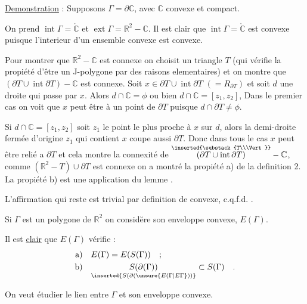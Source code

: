 \uline{Demonstration} : Supposons $\Gamma=\partial\mathbb{C}$, avec $\mathbb{C}$ convexe et compact.

On prend $\operatorname{int}\Gamma=\mathring{\mathbb{C}}$ et $\operatorname{ext}\Gamma=\mathbb{R}^{2}-\mathbb{C}$. Il est clair que $\operatorname{int}\Gamma=\mathring{\mathbb{C}}$ est convexe puisque l'interieur d'un ensemble convexe est convexe.

Pour montrer que $\mathbb{R}^{2}-\mathbb{C}$ est connexe on choisit un triangle $T$ (qui vérifie la propiété d'être un J-polygone par des raisons elementaires) et on montre que $(\partial T\cup\operatorname{int}\partial T)-\mathbb{C}$ est connexe. Soit $x\in\partial T\cup\operatorname{int}\partial T$  $(=R_{\partial T})$  et soit $d$ une droite qui passe par $x$. Alors $d\cap\mathbb{C}=\phi$ ou bien $d\cap\mathbb{C}=[z_1,z_2]$, Dans le premier cas on voit que $x$ peut être  à un point de $\partial T$ puisque $d\cap\partial T\ne\phi$.

Si $d\cap\mathbb{C}=[z_1,z_2]$ soit $z_1$ le point  le plus proche à $x$ sur $d$, alors la demi-droite fermée d'origine $z_1$ qui contient $x$ coupe aussi $\partial T$. Donc dans tous le cas $x$ peut être relié a $\partial T$ et cela montre la connexité de $\overset{\inserted{\substack{T\\\Vert}}}{(\partial T\cup\operatorname{int}\partial T)}-\mathbb{C}$, comme $(\mathbb{R}^{2}-T)\cup\partial T$ est connexe  on a montré la propiété a) de la definition 2. La propiété b) est une application  du lemme .

\margin{$\bullet$}
L'affirmation qui reste est trivial par definition de convexe,  c.q.f.d. .

\margin{$\bullet$}
Si $\Gamma$ est un polygone de $\mathbb{R}^{2}$ on considĕre son enveloppe convexe, $E(\Gamma)$.

Il est \uline{clair} que $E(\Gamma)$ vérifie :
\[
\begin{aligned}
\text{a)}\quad & E(\Gamma)=E(S(\Gamma))\quad;\\
\text{b)}\quad & \underset{\inserted{S(\partial(\unsure{E(\Gamma|E\Gamma}))}}{S(\partial(\Gamma))}\subset S(\Gamma)\quad.
\end{aligned}
\]

On veut étudier le lien entre $\Gamma$ et son enveloppe convexe.
